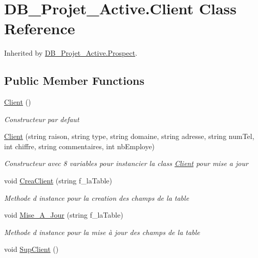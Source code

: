 \hypertarget{class_d_b___projet___active_1_1_client}{}\section{D\+B\+\_\+\+Projet\+\_\+\+Active.\+Client Class Reference}
\label{class_d_b___projet___active_1_1_client}


Inherited by \mbox{\hyperlink{class_d_b___projet___active_1_1_prospect}{D\+B\+\_\+\+Projet\+\_\+\+Active.\+Prospect}}.

\subsection*{Public Member Functions}
\begin{DoxyCompactItemize}
\item 
\mbox{\hyperlink{class_d_b___projet___active_1_1_client_ac2417af48ade43fe2d15374575410aee}{Client}} ()
\begin{DoxyCompactList}\small\item\em Constructeur par defaut \end{DoxyCompactList}\item 
\mbox{\hyperlink{class_d_b___projet___active_1_1_client_a48462a75f0a3ab7c52f503d0bfd23bb2}{Client}} (string raison, string type, string domaine, string adresse, string num\+Tel, int chiffre, string commentaires, int nb\+Employe)
\begin{DoxyCompactList}\small\item\em Constructeur avec 8 variables pour instancier la class \mbox{\hyperlink{class_d_b___projet___active_1_1_client}{Client}} pour mise a jour \end{DoxyCompactList}\item 
void \mbox{\hyperlink{class_d_b___projet___active_1_1_client_ad6963a3fd9228b7ceb33849505560e2d}{Crea\+Client}} (string f\+\_\+la\+Table)
\begin{DoxyCompactList}\small\item\em Methode d instance pour la creation des champs de la table \end{DoxyCompactList}\item 
void \mbox{\hyperlink{class_d_b___projet___active_1_1_client_ab6f25727d279e96785521ca70e82b734}{Mise\+\_\+\+A\+\_\+\+Jour}} (string f\+\_\+la\+Table)
\begin{DoxyCompactList}\small\item\em Methode d instance pour la mise à jour des champs de la table \end{DoxyCompactList}\item 
void \mbox{\hyperlink{class_d_b___projet___active_1_1_client_a8b2d2c340e584eb9fd1f959fe445d7b1}{Sup\+Client}} ()
\end{DoxyCompactItemize}
